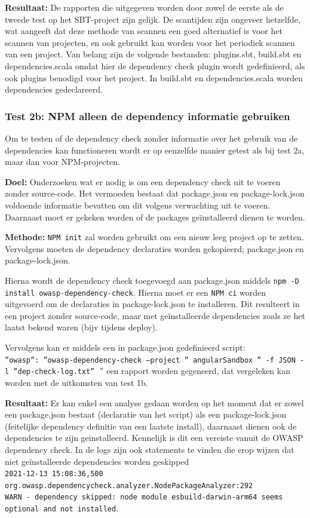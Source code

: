 \textbf{Resultaat:} De rapporten die uitgegeven worden door zowel de eerste als de tweede test op het SBT-project zijn gelijk. De scantijden zijn ongeveer hetzelfde, wat aangeeft dat deze methode van scannen een goed alternatief is voor het scannen van projecten, en ook gebruikt kan worden voor het periodiek scannen van een project. Van belang zijn de volgende bestanden: plugins.sbt, build.sbt en dependencies.scala omdat hier de dependency check plugin wordt gedefinieerd, als ook plugins benodigd voor het project. In build.sbt en dependencies.scala worden dependencies gedeclareerd.


\subsubsection{Test 2b: NPM alleen de dependency informatie gebruiken}
Om te testen of de dependency check zonder informatie over het gebruik van de dependencies kan functioneren wordt er op eenzelfde manier getest als bij test 2a, maar dan voor NPM-projecten.

\textbf{Doel:} Onderzoeken wat er nodig is om een dependency check uit te voeren zonder source-code. Het vermoeden bestaat dat package.json en package-lock.json voldoende informatie bevatten om dit volgens verwachting uit te voeren. Daarnaast moet er gekeken worden of de packages geïnstalleerd dienen te worden.

\textbf{Methode:}
\texttt{NPM init} zal worden gebruikt om een nieuw leeg project op te zetten. Vervolgens moeten de dependency declaraties worden gekopieerd; package.json en package-lock.json.

Hierna wordt de dependency check toegevoegd aan package.json middels \texttt{npm -D install owasp-dependency-check}. Hierna moet er een \texttt{NPM ci} worden uitgevoerd om de declaraties in package-lock.json te installeren. Dit resulteert in een project zonder source-code, maar met geïnstalleerde dependencies zoals ze het laatst bekend waren (bijv tijdens deploy).

Vervolgens kan er middels een in package.json gedefinieerd script:\\ \texttt{''owasp'': ''owasp-dependency-check --project '' angularSandbox '' -f JSON -l ''dep-check-log.txt'' $"$}%
een rapport worden gegeneerd, dat vergeleken kan worden met de uitkomsten van test 1b.

\textbf{Resultaat:}
Er kan enkel een analyse gedaan worden op het moment dat er zowel een package.json bestaat (declaratie van het script) als een package-lock.json (feitelijke dependency definitie van een laatste install), daarnaast dienen ook de dependencies te zijn geinstalleerd. Kennelijk is dit een vereiste vanuit de OWASP dependency check. In de logs zijn ook statements te vinden die erop wijzen dat niet geïnstalleerde dependencies worden geskipped\\
\texttt{2021-12-13 15:08:36,500\\
org.owasp.dependencycheck.analyzer.NodePackageAnalyzer:292\\
WARN  - dependency skipped: node module esbuild-darwin-arm64 seems optional and not installed}.\\

